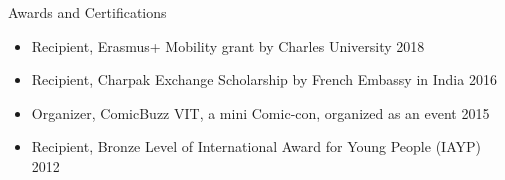 
\begin{rSection}{\faTrophy \hspace{0.5mm} Awards and Certifications}
 
    \begin{itemize}
        \item Recipient, Erasmus+ Mobility grant by Charles University
            \hfill {2018}
        \item Recipient, Charpak Exchange Scholarship by French Embassy in India 
            \hfill {2016}
            
        \item {Organizer, ComicBuzz VIT, a mini Comic-con, organized as an 
            event} \hfill {2015}
        
        \item Recipient, Bronze Level of International Award for Young People (IAYP)
            \hfill {2012}
    \end{itemize}

\end{rSection}
